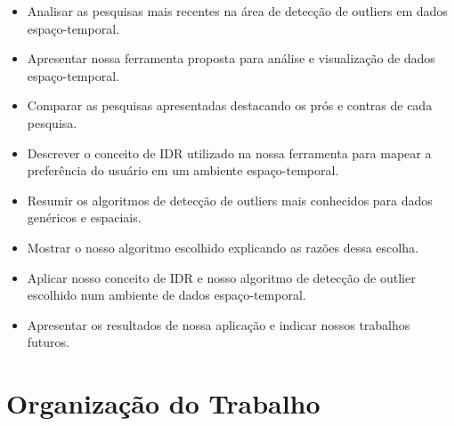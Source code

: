 \begin{itemize}
	\item
	      Analisar as pesquisas mais recentes na área de detecção de outliers em dados espaço-temporal.
	\item
	      Apresentar nossa ferramenta proposta para análise e visualização de dados espaço-temporal.
	\item
	      Comparar as pesquisas apresentadas destacando os prós e contras de cada pesquisa.
	\item
	      Descrever o conceito de IDR utilizado na nossa ferramenta para mapear a preferência do usuário em um ambiente espaço-temporal.
	\item
	      Resumir os algoritmos de detecção de outliers mais conhecidos para dados genéricos e espaciais.
	\item
	      Mostrar o nosso algoritmo escolhido explicando as razões dessa escolha.
	\item
	      Aplicar nosso conceito de IDR e nosso algoritmo de detecção de outlier escolhido num ambiente de dados espaço-temporal.
	\item
	      Apresentar os resultados de nossa aplicação e indicar nossos trabalhos futuros.

\end{itemize}

\section{Organização do Trabalho}

